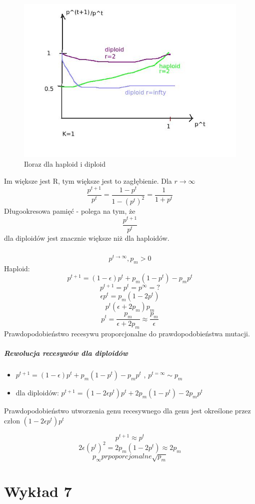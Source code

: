 \documentclass{article}
\begin{document}
		\subparagraph{}
		\begin{figure}[ht]
			\label{fig:fig2}
			\centering
			\includegraphics[scale=0.5]{wyk6_pt1pt.jpeg}
			\caption{Iloraz dla haploid i diploid}
		\end{figure}
		Im większe jest R, tym większe jest to zagłębienie. Dla $r \rightarrow \infty$ 
		$$\frac{p^{t+1}}{p^t}=\frac{1-p^t}{1-(p^t)^2}=\frac{1}{1+p^t}$$
		Długookresowa pamięć - polega na tym, że $$\frac{p^{t+1}}{p^t}$$ dla diploidów jest znacznie większe niż dla haploidów.
		\subparagraph{}
		$$p^{t\rightarrow \infty}, p_m>0$$
		Haploid: $$p^{t+1} = (1-\epsilon)p^t + p_m(1-p^t)-p_mp^t$$
		$$p^{t+1}=p^t=p^\infty = ?$$
		$$\epsilon p^t = p_m(1-2p^t)$$
		$$p^t(\epsilon+2p_m)p_m$$
		$$p^t = \frac{p_m}{\epsilon+2p_m} \approx \frac{p_m}{\epsilon}$$
		Prawdopodobieństwo recesywu proporcjonalne do prawdopodobieństwa mutacji. 
		\subparagraph{Rewolucja recesywów dla diploidów}
		\begin{itemize}
			\item $p^{t+1} = (1 -\epsilon)p^t + p_m(1-p^t)-p_mp^t$ , $p^{t=\infty}\sim p_m$
			\item dla diploidów: $p^{t+1}=(1-2\epsilon p^t)p^t + 2p_m(1-p^t) - 2p_mp^t$
		\end{itemize}
		
		Prawdopodobieństwo utworzenia genu recesywnego dla genu jest określone przez człon $(1-2\epsilon p^t)p^t$
		
		$$p^{t+1} \approx p^t$$
		$$2\epsilon (p^t)^2 = 2p_m(1-2p^t) \approx 2p_m$$
		$$p_{\infty} prpoporcjonalne \sqrt{p_m} $$
		
		\section{Wykład 7}
\end{document}
